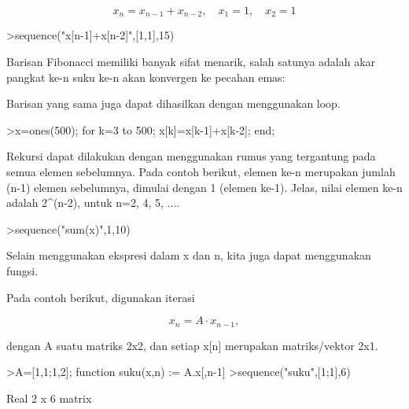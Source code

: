 \documentclass[a4paper,10pt]{article}
\begin{document}
\begin{eulernotebook}
\begin{eulercomment}
\begin{eulercomment}
\begin{eulercomment}
\begin{eulercomment}
\begin{eulercomment}
\end{eulercomment}
\begin{eulerformula}
\[
x_n = x_{n-1}+x_{n-2}, \quad x_1=1, \quad x_2 =1
\]
\end{eulerformula}
\begin{eulerprompt}
>sequence("x[n-1]+x[n-2]",[1,1],15)
\end{eulerprompt}
\begin{euleroutput}
  [1,  1,  2,  3,  5,  8,  13,  21,  34,  55,  89,  144,  233,  377,  610]
\end{euleroutput}
\begin{eulercomment}
Barisan Fibonacci memiliki banyak sifat menarik, salah satunya adalah akar pangkat ke-n suku
ke-n akan konvergen ke pecahan emas:
\end{eulercomment}
\begin{eulercomment}
Barisan yang sama juga dapat dihasilkan dengan menggunakan loop.
\end{eulercomment}
\begin{eulerprompt}
>x=ones(500); for k=3 to 500; x[k]=x[k-1]+x[k-2]; end;
\end{eulerprompt}
\begin{eulercomment}
Rekursi dapat dilakukan dengan menggunakan rumus yang tergantung pada semua elemen
sebelumnya. Pada contoh berikut, elemen ke-n merupakan jumlah (n-1) elemen sebelumnya,
dimulai dengan 1 (elemen ke-1). Jelas, nilai elemen ke-n adalah 2\textasciicircum{}(n-2), untuk n=2, 4, 5,
....
\end{eulercomment}
\begin{eulerprompt}
>sequence("sum(x)",1,10)
\end{eulerprompt}
\begin{euleroutput}
  [1,  1,  2,  4,  8,  16,  32,  64,  128,  256]
\end{euleroutput}
\begin{eulercomment}
Selain menggunakan ekspresi dalam x dan n, kita juga dapat menggunakan fungsi.

Pada contoh berikut, digunakan iterasi

\end{eulercomment}
\begin{eulerformula}
\[
x_n =A \cdot x_{n-1},
\]
\end{eulerformula}
\begin{eulercomment}
dengan A suatu matriks 2x2, dan setiap x[n] merupakan matriks/vektor 2x1.
\end{eulercomment}
\begin{eulerprompt}
>A=[1,1;1,2]; function suku(x,n) := A.x[,n-1]
>sequence("suku",[1;1],6)
\end{eulerprompt}
\begin{euleroutput}
  Real 2 x 6 matrix
  

\end{euleroutput}
\end{eulercomment}
\end{eulercomment}
\end{eulercomment}
\end{eulercomment}
\end{eulernotebook}
\end{document}
